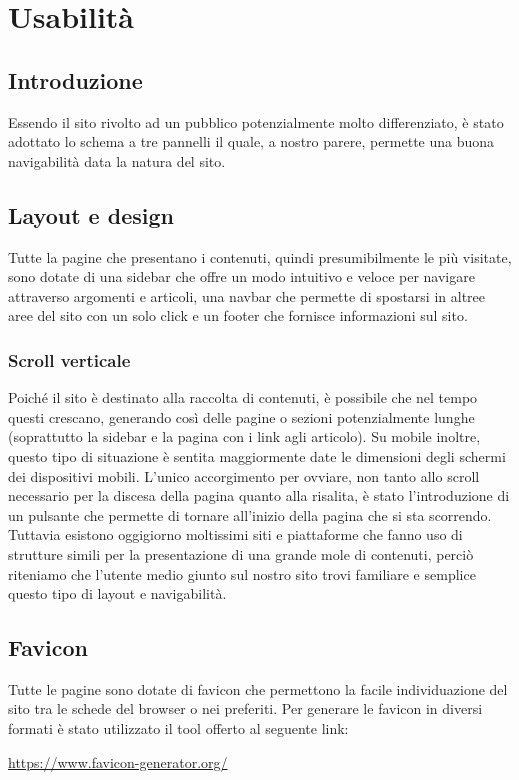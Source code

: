 \documentclass[12pt]{article}
\begin{document}
	\section{Usabilità}
	\subsection{Introduzione}
	Essendo il sito rivolto ad un pubblico potenzialmente molto differenziato, è stato adottato lo schema a tre pannelli il quale, a nostro parere, permette una buona navigabilità data la natura del sito.
	\subsection{Layout e design}
	Tutte la pagine che presentano i contenuti, quindi presumibilmente le più visitate, sono dotate di una sidebar che offre un modo intuitivo e veloce per navigare attraverso argomenti e articoli, una navbar che permette di spostarsi in altree aree del sito con un solo click e un footer che fornisce informazioni sul sito.
	\subsubsection{Scroll verticale}
	Poiché il sito è destinato alla raccolta di contenuti, è possibile che nel tempo questi crescano, generando così delle pagine o sezioni potenzialmente lunghe (soprattutto la sidebar e la pagina con i link agli articolo). Su mobile inoltre, questo tipo di situazione è sentita maggiormente date le dimensioni degli schermi dei dispositivi mobili. L'unico accorgimento per ovviare, non tanto allo scroll necessario per la discesa della pagina quanto alla risalita, è stato l'introduzione di un pulsante che permette di tornare all'inizio della pagina che si sta scorrendo. Tuttavia esistono oggigiorno moltissimi siti e piattaforme che fanno uso di strutture simili per la presentazione di una grande mole di contenuti, perciò riteniamo che l'utente medio giunto sul nostro sito trovi familiare e semplice questo tipo di layout e navigabilità.
	
	\subsection{Favicon}
	Tutte le pagine sono dotate di favicon che permettono la facile individuazione del sito tra le schede del browser o nei preferiti. Per generare le favicon in diversi formati è stato utilizzato il tool offerto al seguente link:
	\begin{center} 
		\url{https://www.favicon-generator.org/} 
	\end{center}
	
\end{document}
